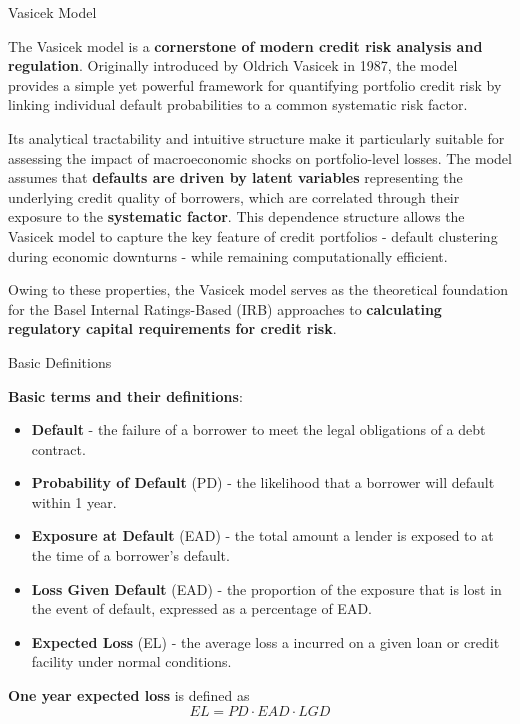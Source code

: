 \documentclass{beamer}
\begin{document}
\begin{frame}{Vasicek Model}
\justifying
\small

The Vasicek model is a \textbf{cornerstone of modern credit risk analysis and regulation}. Originally introduced by Oldrich Vasicek in 1987, the model provides a simple yet powerful framework for quantifying portfolio credit risk by linking individual default probabilities to a common systematic risk factor.

\medskip

Its analytical tractability and intuitive structure make it particularly suitable for assessing the impact of macroeconomic shocks on portfolio-level losses. The model assumes that \textbf{defaults are driven by latent variables} representing the underlying credit quality of borrowers, which are correlated through their exposure to the \textbf{systematic factor}. This dependence structure allows the Vasicek model to capture the key feature of credit portfolios - default clustering during economic downturns - while remaining computationally efficient.

\medskip

Owing to these properties, the Vasicek model serves as the theoretical foundation for the Basel Internal Ratings-Based (IRB) approaches to \textbf{calculating regulatory capital requirements for credit risk}.

\end{frame}

\begin{frame}{Basic Definitions}
\justifying
\small

\textbf{Basic terms and their definitions}:
\begin{itemize}
\item \textbf{Default} - the failure of a borrower to meet the legal obligations of a debt contract.
\item \textbf{Probability of Default} (PD) - the likelihood that a borrower will default within 1 year.
\item \textbf{Exposure at Default} (EAD) - the total amount a lender is exposed to at the time of a borrower's default.
\item \textbf{Loss Given Default} (EAD) - the proportion of the exposure that is lost in the event of default, expressed as a percentage of EAD.
\item \textbf{Expected Loss} (EL) - the average loss a incurred on a given loan or credit facility under normal conditions.
\end{itemize}

\medskip

\textbf{One year expected loss} is defined as
\begin{equation}
EL = PD \cdot EAD \cdot LGD
\end{equation}

\end{frame}
\end{document}
